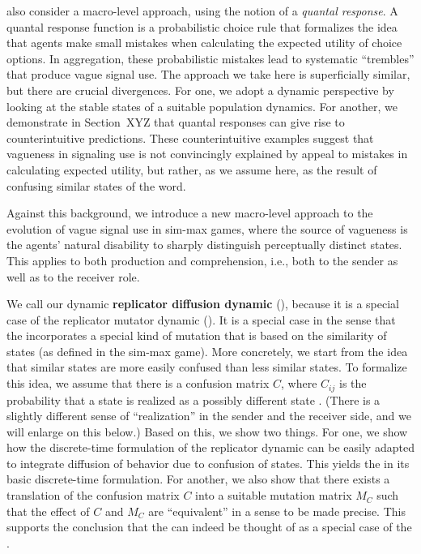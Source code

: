 \citet{FrankeJager2010:Vagueness-Signa} also consider a macro-level
approach, using the notion of a \emph{quantal response}. A quantal
response function is a probabilistic choice rule that formalizes the
idea that agents make small mistakes when calculating the expected
utility of choice options. In aggregation, these probabilistic
mistakes lead to systematic ``trembles'' that produce vague signal
use. The approach we take here is superficially similar, but there are
crucial divergences. For one, we adopt a dynamic perspective by
looking at the stable states of a suitable population dynamics. For
another, we demonstrate in Section~XYZ that quantal responses can give
rise to counterintuitive predictions. These counterintuitive examples
suggest that vagueness in signaling use is not convincingly explained
by appeal to mistakes in calculating expected utility, but rather, as
we assume here, as the result of confusing similar states of the word.

Against this background, we introduce a new macro-level approach
to the evolution of vague signal use in sim-max games, where the
source of vagueness is the agents' natural disability to sharply
distinguish perceptually distinct states. This applies to both
production and comprehension, i.e., both to the sender as well as to
the receiver role. 

We call our dynamic \textbf{replicator diffusion dynamic} (\rdd),
because it is a special case of the replicator mutator dynamic
(\rmd). It is a special case in the sense that the \rdd incorporates a
special kind of mutation that is based on the similarity of states (as
defined in the sim-max game). More concretely, we start from the idea
that similar states are more easily confused than less similar
states. To formalize this idea, we assume that there is a confusion
matrix $C$, where $C_{ij}$ is the probability that a state 
is realized as a possibly different state . (There is a
slightly different sense of ``realization'' in the sender and the
receiver side, and we will enlarge on this below.) Based on this, we
show two things. For one, we show how the discrete-time formulation of
the replicator dynamic can be easily adapted to integrate diffusion of
behavior due to confusion of states. This yields the \rdd in its basic
discrete-time formulation. For another, we also show that there exists
a translation of the confusion matrix $C$ into a suitable mutation
matrix $M_C$ such that the effect of $C$ and $M_C$ are ``equivalent''
in a sense to be made precise. This supports the conclusion that the
\rdd can indeed be thought of as a special case of the \rmd.

